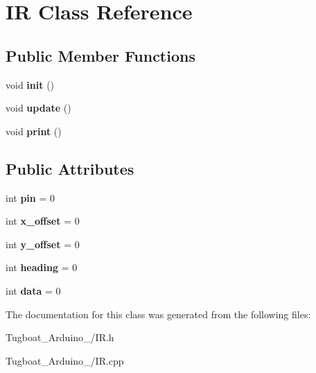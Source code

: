 \hypertarget{class_i_r}{}\section{IR Class Reference}
\label{class_i_r}
\subsection*{Public Member Functions}
\begin{DoxyCompactItemize}
\item 
void {\bfseries init} ()\hypertarget{class_i_r_a7c5d9ba17b7d3c26e4e284da1763d0a7}{}\label{class_i_r_a7c5d9ba17b7d3c26e4e284da1763d0a7}

\item 
void {\bfseries update} ()\hypertarget{class_i_r_acdde67e3ad75d030457be93fc2682999}{}\label{class_i_r_acdde67e3ad75d030457be93fc2682999}

\item 
void {\bfseries print} ()\hypertarget{class_i_r_a11b729611514f95ef01c115db86b27b3}{}\label{class_i_r_a11b729611514f95ef01c115db86b27b3}

\end{DoxyCompactItemize}
\subsection*{Public Attributes}
\begin{DoxyCompactItemize}
\item 
int {\bfseries pin} = 0\hypertarget{class_i_r_a638c3210a15cc10dc5a9753ba1bd21cf}{}\label{class_i_r_a638c3210a15cc10dc5a9753ba1bd21cf}

\item 
int {\bfseries x\+\_\+offset} = 0\hypertarget{class_i_r_a0d957c8d3488651c72085702b5beb5f2}{}\label{class_i_r_a0d957c8d3488651c72085702b5beb5f2}

\item 
int {\bfseries y\+\_\+offset} = 0\hypertarget{class_i_r_a80113b9db53ff9177fa0fdcd65cf7d62}{}\label{class_i_r_a80113b9db53ff9177fa0fdcd65cf7d62}

\item 
int {\bfseries heading} = 0\hypertarget{class_i_r_ad53c7f3e0582c9ddbbdfcf4a38e61f7e}{}\label{class_i_r_ad53c7f3e0582c9ddbbdfcf4a38e61f7e}

\item 
int {\bfseries data} = 0\hypertarget{class_i_r_aa144ad3dd59f51c81679379bb133deb4}{}\label{class_i_r_aa144ad3dd59f51c81679379bb133deb4}

\end{DoxyCompactItemize}


The documentation for this class was generated from the following files\+:\begin{DoxyCompactItemize}
\item 
Tugboat\+\_\+\+Arduino\+\_/I\+R.\+h\item 
Tugboat\+\_\+\+Arduino\+\_/I\+R.\+cpp\end{DoxyCompactItemize}
